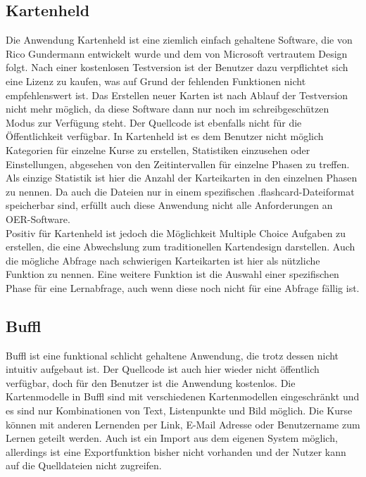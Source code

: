 \subsection{Kartenheld}
Die Anwendung Kartenheld \cite{kartenheld} ist eine ziemlich einfach gehaltene Software, die von Rico Gundermann entwickelt wurde und dem von Microsoft vertrautem Design folgt. Nach einer kostenlosen Testversion ist der Benutzer dazu verpflichtet sich eine Lizenz zu kaufen, was auf Grund der fehlenden Funktionen nicht empfehlenswert ist. Das Erstellen neuer Karten ist nach Ablauf der Testversion nicht mehr möglich, da diese Software dann nur noch im schreibgeschützen Modus zur Verfügung steht. Der Quellcode ist ebenfalls nicht für die Öffentlichkeit verfügbar. In Kartenheld ist es dem Benutzer nicht möglich Kategorien für einzelne Kurse zu erstellen, Statistiken einzusehen oder Einstellungen, abgesehen von den Zeitintervallen für einzelne Phasen zu treffen. Als einzige Statistik ist hier die Anzahl der Karteikarten in den einzelnen Phasen zu nennen. Da auch die Dateien nur in einem spezifischen .flashcard-Dateiformat speicherbar sind, erfüllt auch diese Anwendung nicht alle Anforderungen an OER-Software. \\

\noindent Positiv für Kartenheld ist jedoch die Möglichkeit Multiple Choice Aufgaben zu erstellen, die eine Abwechslung zum traditionellen Kartendesign darstellen. Auch die mögliche Abfrage nach schwierigen Karteikarten ist hier als nützliche Funktion zu nennen. Eine weitere Funktion ist die Auswahl einer spezifischen Phase für eine Lernabfrage, auch wenn diese noch nicht für eine Abfrage fällig ist. \\


\subsection{Buffl}
Buffl \cite{buffl} ist eine funktional schlicht gehaltene Anwendung, die trotz dessen nicht intuitiv aufgebaut ist. Der Quellcode ist auch hier wieder nicht öffentlich verfügbar, doch für den Benutzer ist die Anwendung kostenlos. Die Kartenmodelle in Buffl sind mit verschiedenen Kartenmodellen eingeschränkt und es sind nur Kombinationen von Text, Listenpunkte und Bild möglich. Die Kurse können mit anderen Lernenden per Link, E-Mail Adresse oder Benutzername zum Lernen geteilt werden. Auch ist ein Import aus dem eigenen System möglich, allerdings ist eine Exportfunktion bisher nicht vorhanden und der Nutzer kann auf die Quelldateien nicht zugreifen. 



